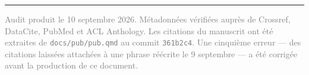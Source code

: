 \documentclass[11pt,a4paper]{article}
\newcommand{\cle}[1]{\texttt{\small #1}}
\begin{document}
\vspace{4mm}
\noindent\rule{\linewidth}{0.4pt}
\vspace{1mm}

\noindent\small\textcolor{grey}{Audit produit le 10 septembre 2026. Métadonnées
vérifiées auprès de Crossref, DataCite, PubMed et ACL Anthology. Les citations
du manuscrit ont été extraites de \cle{docs/pub/pub.qmd} au commit
\cle{361b2c4}. Une cinquième erreur --- des citations laissées attachées à une
phrase réécrite le 9 septembre --- a été corrigée avant la production de ce
document.}
\end{document}
